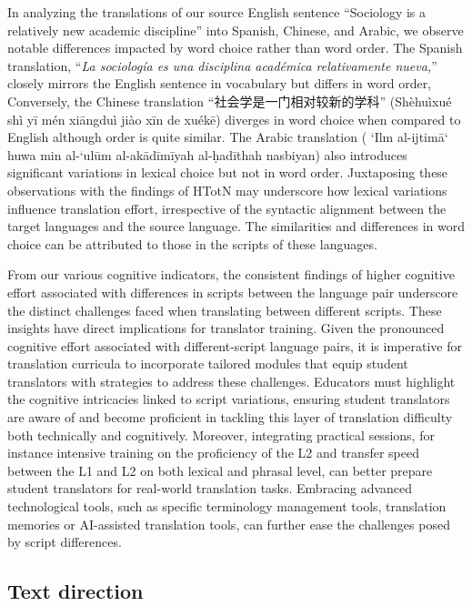 \documentclass[output=paper]{langscibook}
\begin{document}
In analyzing the translations of our source English sentence “Sociology is a relatively new academic discipline” into Spanish, Chinese, and Arabic, we observe notable differences impacted by word choice rather than word order. The Spanish translation, “\textit{La sociología es una disciplina académica relativamente nueva,}” closely mirrors the English sentence in vocabulary but differs in word order, Conversely, the Chinese translation “{\cn 社会学是一门相对较新的学科}” (Shèhuìxué shì yī mén xiāngduì jiào xīn de xuékē) diverges in word choice when compared to English although order is quite similar. The Arabic translation
(
\normalfont
‘Ilm al-ijtimā‘ huwa min al-‘ulūm al-akādīmīyah al-ḥadīthah nasbiyan) also introduces significant variations in lexical choice but not in word order. Juxtaposing these observations with the findings of HTotN may underscore how lexical variations influence translation effort, irrespective of the syntactic alignment between the target languages and the source language. The similarities and differences in word choice can be attributed to those in the scripts of these languages.

From our various cognitive indicators, the consistent findings of higher cognitive effort associated with differences in scripts between the language pair underscore the distinct challenges faced when translating between different scripts. These insights have direct implications for translator training. Given the pronounced cognitive effort associated with different-script language pairs, it is imperative for translation curricula to incorporate tailored modules that equip student translators with strategies to address these challenges. Educators must highlight the cognitive intricacies linked to script variations, ensuring student translators are aware of and become proficient in tackling this layer of translation difficulty both technically and cognitively. Moreover, integrating practical sessions, for instance intensive training on the proficiency of the L2 and transfer speed between the L1 and L2 on both lexical and phrasal level, can better prepare student translators for real-world translation tasks. Embracing advanced technological tools, such as specific terminology management tools, translation memories or AI-assisted translation tools, can further ease the challenges posed by script differences.

\subsection{Text direction}
\end{document}
